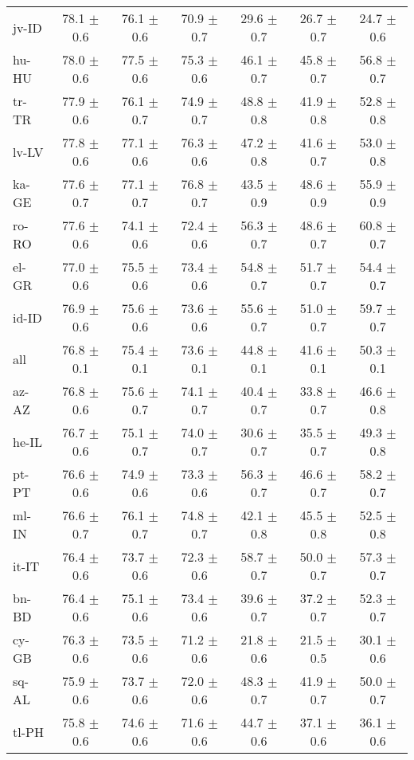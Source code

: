 \documentclass[11pt]{article}
\begin{document}
\begin{table*}[]
{\begin{tabular}{lcccccc}
jv-ID & 78.1 $\pm$ 0.6 & 76.1 $\pm$ 0.6 & 70.9 $\pm$ 0.7 & 29.6 $\pm$ 0.7 & 26.7 $\pm$ 0.7 & 24.7 $\pm$ 0.6 \\
hu-HU & 78.0 $\pm$ 0.6 & 77.5 $\pm$ 0.6 & 75.3 $\pm$ 0.6 & 46.1 $\pm$ 0.7 & 45.8 $\pm$ 0.7 & 56.8 $\pm$ 0.7 \\
tr-TR & 77.9 $\pm$ 0.6 & 76.1 $\pm$ 0.7 & 74.9 $\pm$ 0.7 & 48.8 $\pm$ 0.8 & 41.9 $\pm$ 0.8 & 52.8 $\pm$ 0.8 \\
lv-LV & 77.8 $\pm$ 0.6 & 77.1 $\pm$ 0.6 & 76.3 $\pm$ 0.6 & 47.2 $\pm$ 0.8 & 41.6 $\pm$ 0.7 & 53.0 $\pm$ 0.8 \\
ka-GE & 77.6 $\pm$ 0.7 & 77.1 $\pm$ 0.7 & 76.8 $\pm$ 0.7 & 43.5 $\pm$ 0.9 & 48.6 $\pm$ 0.9 & 55.9 $\pm$ 0.9 \\
ro-RO & 77.6 $\pm$ 0.6 & 74.1 $\pm$ 0.6 & 72.4 $\pm$ 0.6 & 56.3 $\pm$ 0.7 & 48.6 $\pm$ 0.7 & 60.8 $\pm$ 0.7 \\
el-GR & 77.0 $\pm$ 0.6 & 75.5 $\pm$ 0.6 & 73.4 $\pm$ 0.6 & 54.8 $\pm$ 0.7 & 51.7 $\pm$ 0.7 & 54.4 $\pm$ 0.7 \\
id-ID & 76.9 $\pm$ 0.6 & 75.6 $\pm$ 0.6 & 73.6 $\pm$ 0.6 & 55.6 $\pm$ 0.7 & 51.0 $\pm$ 0.7 & 59.7 $\pm$ 0.7 \\
all & 76.8 $\pm$ 0.1 & 75.4 $\pm$ 0.1 & 73.6 $\pm$ 0.1 & 44.8 $\pm$ 0.1 & 41.6 $\pm$ 0.1 & 50.3 $\pm$ 0.1 \\
az-AZ & 76.8 $\pm$ 0.6 & 75.6 $\pm$ 0.7 & 74.1 $\pm$ 0.7 & 40.4 $\pm$ 0.7 & 33.8 $\pm$ 0.7 & 46.6 $\pm$ 0.8 \\
he-IL & 76.7 $\pm$ 0.6 & 75.1 $\pm$ 0.7 & 74.0 $\pm$ 0.7 & 30.6 $\pm$ 0.7 & 35.5 $\pm$ 0.7 & 49.3 $\pm$ 0.8 \\
pt-PT & 76.6 $\pm$ 0.6 & 74.9 $\pm$ 0.6 & 73.3 $\pm$ 0.6 & 56.3 $\pm$ 0.7 & 46.6 $\pm$ 0.7 & 58.2 $\pm$ 0.7 \\
ml-IN & 76.6 $\pm$ 0.7 & 76.1 $\pm$ 0.7 & 74.8 $\pm$ 0.7 & 42.1 $\pm$ 0.8 & 45.5 $\pm$ 0.8 & 52.5 $\pm$ 0.8 \\
it-IT & 76.4 $\pm$ 0.6 & 73.7 $\pm$ 0.6 & 72.3 $\pm$ 0.6 & 58.7 $\pm$ 0.7 & 50.0 $\pm$ 0.7 & 57.3 $\pm$ 0.7 \\
bn-BD & 76.4 $\pm$ 0.6 & 75.1 $\pm$ 0.6 & 73.4 $\pm$ 0.6 & 39.6 $\pm$ 0.7 & 37.2 $\pm$ 0.7 & 52.3 $\pm$ 0.7 \\
cy-GB & 76.3 $\pm$ 0.6 & 73.5 $\pm$ 0.6 & 71.2 $\pm$ 0.6 & 21.8 $\pm$ 0.6 & 21.5 $\pm$ 0.5 & 30.1 $\pm$ 0.6 \\
sq-AL & 75.9 $\pm$ 0.6 & 73.7 $\pm$ 0.6 & 72.0 $\pm$ 0.6 & 48.3 $\pm$ 0.7 & 41.9 $\pm$ 0.7 & 50.0 $\pm$ 0.7 \\
tl-PH & 75.8 $\pm$ 0.6 & 74.6 $\pm$ 0.6 & 71.6 $\pm$ 0.6 & 44.7 $\pm$ 0.6 & 37.1 $\pm$ 0.6 & 36.1 $\pm$ 0.6 \\

\end{tabular}}
\end{table*}
\end{document}
